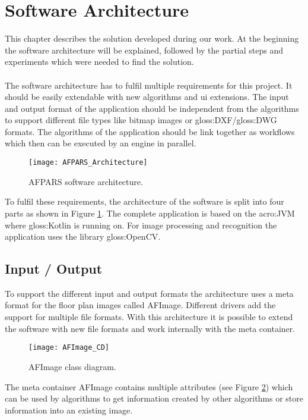 \section{Software Architecture}
This chapter describes the solution developed during our work. At the beginning the software architecture will be explained, followed by the partial steps and experiments which were needed to find the solution.
\\\\
The software architecture has to fulfil multiple requirements for this project. It should be easily extendable with new algorithms and ui extensions. The input and output format of the application should be independent from the algorithms to support different file types like bitmap images or \gls{gloss:DXF}/\gls{gloss:DWG} formats. The algorithms of the application should be link together as workflows which then can be executed by an engine in parallel.

\begin{figure}[h]
  \centering
      \texttt{[image: AFPARS\_Architecture]}
  \caption{AFPARS software architecture.}
  \label{fig:AFPARS_Architecture}
\end{figure}

To fulfil these requirements, the architecture of the software is split into four parts as shown in Figure \ref{fig:AFPARS_Architecture}. The complete application is based on the \acrfull{acro:JVM} where \gls{gloss:Kotlin} is running on. For image processing and recognition the application uses the library \gls{gloss:OpenCV}.

\pagebreak

\subsection{Input / Output}
To support the different input and output formats the architecture uses a meta format for the
floor plan images called AFImage. Different drivers add the support for multiple file formats. With this architecture it is possible to extend the software with new file formats and work internally with the meta container.

\begin{figure}[h]
  \centering
      \texttt{[image: AFImage\_CD]}
  \caption{AFImage class diagram.}
  \label{fig:AFImage_CD}
\end{figure}

The meta container AFImage contains multiple attributes (see Figure \ref{fig:AFImage_CD}) which can be used by algorithms to get information created by other algorithms or store information into an existing image.

